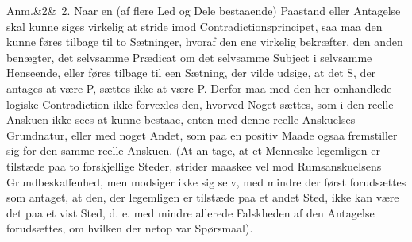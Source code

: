 \documentclass[12pt]{book}
\def\sperr#1{#1}%
\def\textit#1{#1}%
\newcommand{\sperr}[1]{\textls[180]{#1}}
\newcommand{\anm}[1]{%
  \par\vspace{0.5\baselineskip}%
  \noindent\hspace{\parindent}\sperr{Anm.}\ifx&#1&\else~\textit{#1}.\fi
  \enspace\ignorespaces
}
\newcommand{\opage}[1]{\marginnote{\footnotesize\textit{[#1]}}}
\begin{document}
\anm{2} Naar en (af flere Led og Dele bestaaende) Paastand eller Antagelse skal
kunne siges virkelig at stride imod Contradictionsprincipet, saa maa den kunne
føres tilbage til to Sætninger, hvoraf den ene virkelig bekræfter, den anden
benægter, det selvsamme Prædicat om det selvsamme Subject i selvsamme
Henseende, eller føres tilbage til een Sætning, der vilde udsige, at det
\textit{S}, der antages at være \textit{P}, sættes ikke at være \textit{P}.
Derfor maa med den her omhandlede logiske Contradiction ikke forvexles den,
hvorved Noget sættes, som i den reelle Anskuen ikke sees at kunne bestaae,
enten med denne reelle Anskuelses Grundnatur, eller med noget Andet, som paa en
positiv Maade ogsaa fremstiller sig for den samme reelle Anskuen. (At an%
\opage{317}tage, at et Menneske legemligen er tilstæde paa to forskjellige Steder, strider
maaskee vel mod Rumsanskuelsens Grundbeskaffenhed, men modsiger ikke sig selv,
med mindre der først forudsættes som antaget, at den, der legemligen er
tilstæde paa et andet Sted, ikke kan være det paa et vist Sted, d. e. med
mindre allerede Falskheden af den Antagelse forudsættes, om hvilken der netop
var Spørsmaal).
\end{document}
